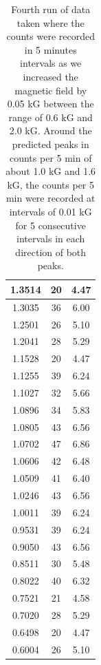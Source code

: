 \begin{table}[t]
\begin{minipage}[b]{0.45\linewidth}
\begin{tabular}{|c|c|c|}
1.3514	&	20	&	4.47	\\ \hline
1.3035	&	36	&	6.00	\\ \hline
1.2501	&	26	&	5.10	\\ \hline
1.2041	&	28	&	5.29	\\ \hline
1.1528	&	20	&	4.47	\\ \hline
1.1255	&	39	&	6.24	\\ \hline
1.1027	&	32	&	5.66	\\ \hline
1.0896	&	34	&	5.83	\\ \hline
1.0805	&	43	&	6.56	\\ \hline
1.0702	&	47	&	6.86	\\ \hline
1.0606	&	42	&	6.48	\\ \hline
1.0509	&	41	&	6.40	\\ \hline
1.0246	&	43	&	6.56	\\ \hline
1.0011	&	39	&	6.24	\\ \hline
0.9531	&	39	&	6.24	\\ \hline
0.9050	&	43	&	6.56	\\ \hline
0.8511	&	30	&	5.48	\\ \hline
0.8022	&	40	&	6.32	\\ \hline
0.7521	&	21	&	4.58	\\ \hline
0.7020	&	28	&	5.29	\\ \hline
0.6498	&	20	&	4.47	\\ \hline
0.6004	&	26	&	5.10	\\ \hline
\end{tabular}
\end{minipage}
\caption{Fourth run of data taken where the counts were recorded in 5 minutes intervals as we increased the magnetic field by 0.05 kG between the range of 0.6 kG and 2.0 kG. Around the predicted peaks in counts per 5 min of about 1.0 kG and 1.6 kG, the counts per 5 min were recorded at intervals of 0.01 kG for 5 consecutive intervals in each direction of both peaks. }
\end{table}



  
